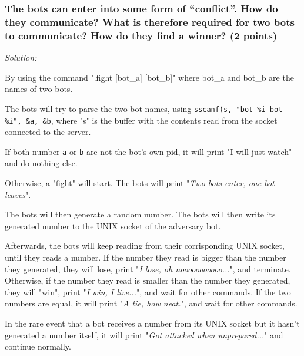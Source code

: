 \documentclass[a4paper,11pt]{article}
\newenvironment{solution}%
{\par{\noindent\small\textit{Solution:}}\vspace{-12pt}\begin{framed}}%
{\end{framed}\par}
\begin{document}
\subsubsection*{The bots can enter into some form of ``conflict''. How do they
communicate? What is therefore required for two bots to communicate? How do they
find a winner? \ifsolution (2 points) \fi}

\ifsolution
\begin{solution}

\setlength\parindent{10pt}

By using the command ".fight [bot\_a] [bot\_b]"  where bot\_a and bot\_b are the names of two bots.

The bots will try to parse the two bot names, using \texttt{sscanf(s, "bot-\%i bot-\%i", \&a, \&b}, 
where "s" is the buffer with the contents read from the socket connected to the server.

If both number \texttt{a} or \texttt{b} are not the bot's own pid, it will print "I will just watch" 
and do nothing else.

Otherwise, a "fight" will start. The bots will print "\textit{Two bots enter, one bot leaves}".

The bots will then generate a random number. The bots will then write its generated number to the 
UNIX socket of the adversary bot. 

Afterwards, the bots will keep reading from their corrisponding UNIX socket, until they reads a number.
If the number they read is bigger than the number they generated, they will lose, print
"\textit{I lose, oh nooooooooooo...}", and terminate.
Otherwise, if the number they read is smaller than the number they generated, they will "win",
print "\textit{I win, I live...}", and wait for other commands.
If the two numbers are equal, it will print "\textit{A tie, how neat.}", and wait for other commands.

In the rare event that a bot receives a number from its UNIX socket but it hasn't generated a number itself,
	it will print "\textit{Got attacked when unprepared...}" and continue normally.
\end{solution}\fi
\end{document}
